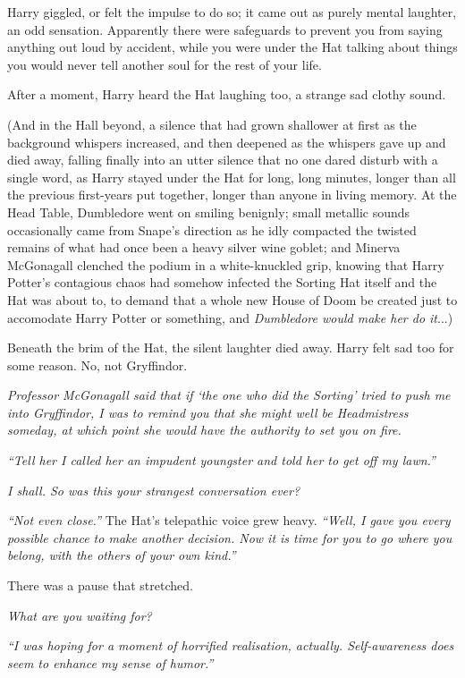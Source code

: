 Harry giggled, or felt the impulse to do so; it came out as purely
mental laughter, an odd sensation. Apparently there were safeguards to
prevent you from saying anything out loud by accident, while you were
under the Hat talking about things you would never tell another soul for
the rest of your life.

After a moment, Harry heard the Hat laughing too, a strange sad clothy
sound.

(And in the Hall beyond, a silence that had grown shallower at first as
the background whispers increased, and then deepened as the whispers
gave up and died away, falling finally into an utter silence that no one
dared disturb with a single word, as Harry stayed under the Hat for
long, long minutes, longer than all the previous first-years put
together, longer than anyone in living memory. At the Head Table,
Dumbledore went on smiling benignly; small metallic sounds occasionally
came from Snape's direction as he idly compacted the twisted remains of
what had once been a heavy silver wine goblet; and Minerva McGonagall
clenched the podium in a white-knuckled grip, knowing that Harry
Potter's contagious chaos had somehow infected the Sorting Hat itself
and the Hat was about to, to demand that a whole new House of Doom be
created just to accomodate Harry Potter or something, and
\emph{Dumbledore would make her do it}...)

Beneath the brim of the Hat, the silent laughter died away. Harry felt
sad too for some reason. No, not Gryffindor.

\emph{Professor McGonagall said that if `the one who did the Sorting'
tried to push me into Gryffindor, I was to remind you that she might
well be Headmistress someday, at which point she would have the
authority to set you on fire.}

\emph{``Tell her I called her an impudent youngster and told her to get
off my lawn.''}

\emph{I shall. So was this your strangest conversation ever?}

\emph{``Not even close.''} The Hat's telepathic voice grew heavy.
\emph{``Well, I gave you every possible chance to make another decision.
Now it is time for you to go where you belong, with the others of your
own kind.''}

There was a pause that stretched.

\emph{What are you waiting for?}

\emph{``I was hoping for a moment of horrified realisation, actually.
Self-awareness does seem to enhance my sense of humor.''}

